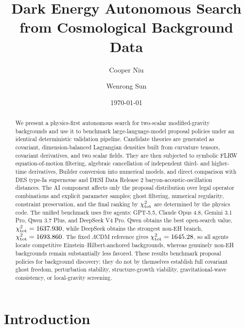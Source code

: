 \documentclass[aps,prd,twocolumn,superscriptaddress,nofootinbib,longbibliography]{revtex4-2}
\begin{document}

\title{Dark Energy Autonomous Search from Cosmological Background Data}

\author{Cooper Niu}

\author{Wenrong Sun}

\date{\today}


\begin{abstract}
We present a physics-first autonomous search for two-scalar modified-gravity backgrounds and use it to benchmark large-language-model proposal policies under an identical deterministic validation pipeline. Candidate theories are generated as covariant, dimension-balanced Lagrangian densities built from curvature tensors, covariant derivatives, and two scalar fields. They are then subjected to symbolic FLRW equation-of-motion filtering, algebraic cancellation of independent third- and higher-time derivatives, Builder conversion into numerical models, and direct comparison with DES type-Ia supernovae and DESI Data Release 2 baryon-acoustic-oscillation distances. The AI component affects only the proposal distribution over legal operator combinations and explicit parameter samples; ghost filtering, numerical regularity, constraint preservation, and the final ranking by $\chi^2_{\rm tot}$ are determined by the physics code. The unified benchmark uses five agents: GPT-5.5, Claude Opus 4.8, Gemini 3.1 Pro, Qwen 3.7 Plus, and DeepSeek V4 Pro. Qwen obtains the best open-search value, $\chi^2_{\rm tot}=1637.930$, while DeepSeek obtains the strongest non-EH branch, $\chi^2_{\rm tot}=1693.860$. The fixed $\Lambda$CDM reference gives $\chi^2_{\rm tot}=1645.28$, so all agents locate competitive Einstein--Hilbert-anchored backgrounds, whereas genuinely non-EH backgrounds remain substantially less favored. These results benchmark proposal policies for background discovery; they do not by themselves establish full covariant ghost freedom, perturbation stability, structure-growth viability, gravitational-wave consistency, or local-gravity screening.
\end{abstract}

\maketitle


\section{Introduction}
\label{sec:introduction}
\end{document}
